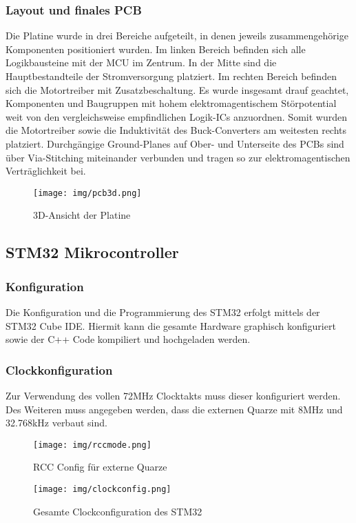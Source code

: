 \documentclass[12pt, a4paper]{report}
\begin{document}
             \subsubsection{Layout und finales PCB}
             Die Platine wurde in drei Bereiche aufgeteilt, in denen jeweils zusammengehörige Komponenten positioniert wurden. Im linken Bereich befinden sich alle Logikbausteine mit der MCU im Zentrum. In der Mitte sind die Hauptbestandteile der Stromversorgung platziert. Im rechten Bereich befinden sich die Motortreiber mit Zusatzbeschaltung.
             Es wurde insgesamt drauf geachtet, Komponenten und Baugruppen mit hohem elektromagentischem Störpotential weit von den vergleichsweise empfindlichen Logik-ICs anzuordnen. Somit wurden die Motortreiber sowie die Induktivität des Buck-Converters am weitesten rechts platziert.
             Durchgängige Ground-Planes auf Ober- und Unterseite des PCBs sind über Via-Stitching miteinander verbunden und tragen so zur elektromagentischen Verträglichkeit bei. 
          \begin{figure}[H]
          \centering
          \texttt{[image: img/pcb3d.png]}
          \caption{3D-Ansicht der Platine}
          \end{figure}
   
         
         \newpage
      \subsection{STM32 Mikrocontroller}
         \subsubsection{Konfiguration}
         Die Konfiguration und die Programmierung des STM32 erfolgt mittels der STM32 Cube IDE. Hiermit kann die gesamte Hardware graphisch konfiguriert sowie der C++ Code kompiliert und hochgeladen werden.
         \subsubsection{Clockkonfiguration}
         Zur Verwendung des vollen 72MHz Clocktakts muss dieser konfiguriert werden. Des Weiteren muss angegeben werden, dass die externen Quarze mit 8MHz und 32.768kHz verbaut sind.
         \begin{figure}[H]
            \centering
            \texttt{[image: img/rccmode.png]}
            \caption{RCC Config für externe Quarze}
         \end{figure}
         \begin{figure}[H]
            \centering
            \texttt{[image: img/clockconfig.png]}
            \caption{Gesamte Clockconfiguration des STM32}
         \end{figure}
\end{document}
